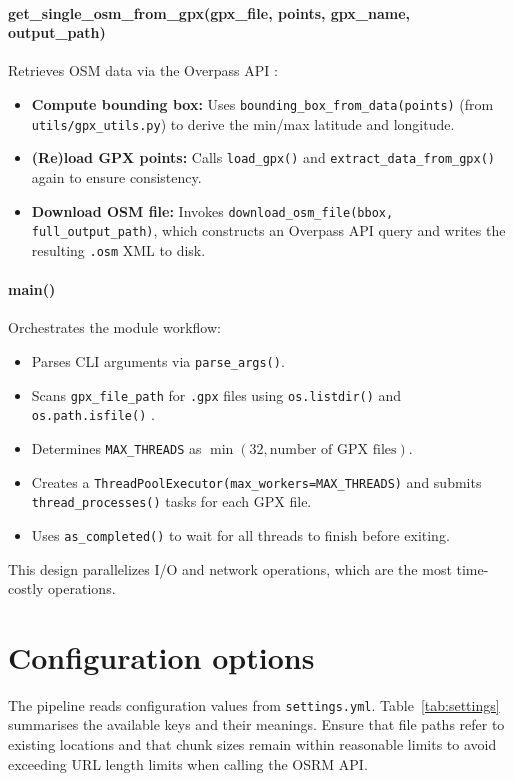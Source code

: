 \documentclass[11pt,a4paper]{article}
\begin{document}
\paragraph{get\_single\_osm\_from\_gpx(gpx\_file, points, gpx\_name, output\_path)}
Retrieves OSM data via the Overpass API \citep{overpass-api-doc}:
\begin{itemize}
	\item \textbf{Compute bounding box:}
	      Uses \texttt{bounding\_box\_from\_data(points)} (from \texttt{utils/gpx\_utils.py}) to derive the min/max latitude and longitude.
	\item \textbf{(Re)load GPX points:}
	      Calls \texttt{load\_gpx()} and \texttt{extract\_data\_from\_gpx()} again to ensure consistency.
	\item \textbf{Download OSM file:}
	      Invokes \texttt{download\_osm\_file(bbox, full\_output\_path)}, which constructs an Overpass API query and writes the resulting \texttt{.osm} XML to disk.
\end{itemize}

\paragraph{main()}
Orchestrates the module workflow:
\begin{itemize}
	\item Parses CLI arguments via \texttt{parse\_args()}.
	\item Scans \texttt{gpx\_file\_path} for \texttt{.gpx} files using \texttt{os.listdir()} and \texttt{os.path.isfile()} \citep{python-os-doc}.
	\item Determines \texttt{MAX\_THREADS} as \(\min(32, \text{number of GPX files})\).
	\item Creates a \texttt{ThreadPoolExecutor(max\_workers=MAX\_THREADS)} and submits \texttt{thread\_processes()} tasks for each GPX file.
	\item Uses \texttt{as\_completed()} to wait for all threads to finish before exiting.
\end{itemize}

\vspace{1ex}\noindent
This design parallelizes I/O and network operations, which are the most time-costly operations.




\section{Configuration options}
The pipeline reads configuration values from \texttt{settings.yml}.  Table~\ref{tab:settings}
summarises the available keys and their meanings.  Ensure that file paths
refer to existing locations and that chunk sizes remain within reasonable
limits to avoid exceeding URL length limits when calling the OSRM API.
\end{document}
